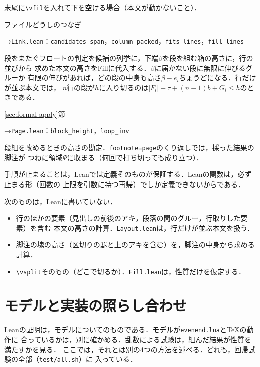 \documentclass[paper=a4,fontsize=10pt]{jlreq}
\newcommand\cs[1]{\texttt{\textbackslash #1}}
\newcommand\opt[1]{\texttt{#1}}
\newcommand\taiou[2]{\par\addvspace{.3\baselineskip}\noindent
  {\raggedright\gtfamily\sffamily\noindent #1\par}\nobreak
  {\raggedright\hangindent=3\zw\hangafter=1\noindent\hspace{1\zw}→\hspace{1\zw}#2\par}\nobreak\noindent\ignorespaces}
\begin{document}
{  末尾に\cs{vfil}を入れて下を空ける場合（本文が動かないこと）．
\taiou{ファイルどうしのつなぎ}{\texttt{Link.lean}：\texttt{candidates\_span}，\texttt{column\_packed}，\texttt{fits\_lines}，\texttt{fill\_lines}}
  段をまたぐフロートの判定を候補の列挙に，下端$\beta$を段を組む箱の高さに，行の並びから
  求めた本文の高さを$\mathrm{Fill}$に代入する．$\beta$に届かない段に無限に伸びるグルーか
  有限の伸びがあれば，どの段の中身も高さ$\beta-e_i$ちょうどになる．行だけが並ぶ本文では，
  $n$行の段が$h$に入り切るのは$|F_i|+\tau+(n-1)b+G_i\le h$のときである．
\taiou{\ref{sec:formal-apply}節}{\texttt{Page.lean}：\texttt{block\_height}，\texttt{loop\_inv}}
  段組を改めるときの高さの勘定．\opt{footnote=page}のくり返しでは，採った結果の脚注が
  つねに領域$\Psi$に収まる（何回で打ち切っても成り立つ）．
\par}


手順が止まることは，Leanでは定義そのものが保証する．Leanの関数は，必ず止まる形（回数の
上限を引数に持つ再帰）でしか定義できないからである．

次のものは，Leanに書いていない．
\begin{itemize}
  \item 行のほかの要素（見出しの前後のアキ，段落の間のグルー，行取りした要素）を含む
    本文の高さの計算．\texttt{Layout.lean}は，行だけが並ぶ本文を扱う．
  \item 脚注の塊の高さ（区切りの罫と上のアキを含む）を，脚注の中身から求める計算．
  \item \cs{vsplit}そのもの（どこで切るか）．\texttt{Fill.lean}は，性質だけを仮定する．
\end{itemize}

\section{モデルと実装の照らし合わせ}\label{sec:model-check}

Leanの証明は，モデルについてのものである．モデルが\texttt{evenend.lua}と\TeX{}の動作に
合っているかは，別に確かめる．乱数による試験は，組んだ結果が性質を満たすかを見る．
ここでは，それとは別の4つの方法を述べる．どれも，回帰試験の全部（\texttt{test/all.sh}）に
入っている．
\end{document}

